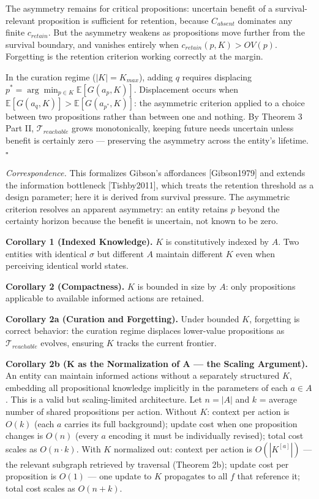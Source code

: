 \documentclass[
]{article}
\begin{document}
The asymmetry remains for critical propositions: uncertain benefit of a
survival-relevant proposition is sufficient for retention, because
\(C_{absent}\) dominates any finite \(c_{retain}\). But the asymmetry
weakens as propositions move further from the survival boundary, and
vanishes entirely when \(c_{retain}(p, K) > OV(p)\). Forgetting is the
retention criterion working correctly at the margin.

In the curation regime (\(|K| = K_{max}\)), adding \(q\) requires
displacing \(p^* = \arg\min_{p \in K} \mathbb{E}[G(a_p, K)]\).
Displacement occurs when
\(\mathbb{E}[G(a_q, K)] > \mathbb{E}[G(a_{p^*}, K)]\): the asymmetric
criterion applied to a choice between two propositions rather than
between one and nothing. By Theorem 3 Part II,
\(\mathcal{T}_{reachable}\) grows monotonically, keeping future needs
uncertain unless benefit is certainly zero --- preserving the asymmetry
across the entity's lifetime. \(\square\)

\emph{Correspondence.} This formalizes Gibson's affordances
{[}Gibson1979{]} and extends the information bottleneck
{[}Tishby2011{]}, which treats the retention threshold as a design
parameter; here it is derived from survival pressure. The asymmetric
criterion resolves an apparent asymmetry:
an entity retains \(p\) beyond the certainty horizon because the
benefit is uncertain, not known to be zero.

\textbf{Corollary 1 (Indexed Knowledge).} \(K\) is constitutively
indexed by \(A\). Two entities with identical \(\sigma\) but different
\(A\) maintain different \(K\) even when perceiving identical world
states.

\textbf{Corollary 2 (Compactness).} \(K\) is bounded in size by \(A\):
only propositions applicable to available informed actions are retained.

\textbf{Corollary 2a (Curation and Forgetting).} Under bounded \(K\),
forgetting is correct behavior: the curation regime displaces
lower-value propositions as \(\mathcal{T}_{reachable}\) evolves,
ensuring \(K\) tracks the current frontier.

\textbf{Corollary 2b (K as the Normalization of A --- the Scaling
Argument).} An entity can maintain informed actions without a separately
structured \(K\), embedding all propositional knowledge implicitly in
the parameters of each \(a \in A\). This is a valid but scaling-limited
architecture. Let \(n = |A|\) and \(k\) = average number of shared
propositions per action. Without \(K\): context per action is \(O(k)\)
(each \(a\) carries its full background); update cost when one
proposition changes is \(O(n)\) (every \(a\) encoding it must be
individually revised); total cost scales as \(O(n \cdot k)\). With \(K\)
normalized out: context per action is \(O(|K^{[a]}|)\) --- the relevant
subgraph retrieved by traversal (Theorem 2b); update cost per
proposition is \(O(1)\) --- one update to \(K\) propagates to all \(f\)
that reference it; total cost scales as \(O(n + k)\).
\end{document}
